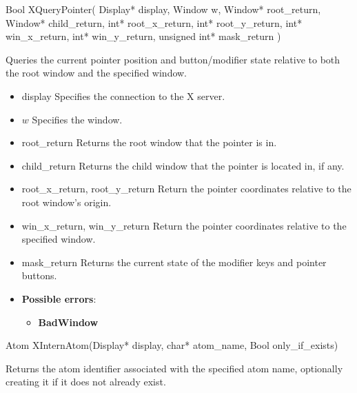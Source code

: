 \documentclass{report}
\begin{document}
\begin{itemize}
            \begin{cppcode}
                Bool XQueryPointer(
                    Display* display,
                    Window w,
                    Window* root_return, Window* child_return,
                    int* root_x_return, int* root_y_return,
                    int* win_x_return, int* win_y_return,
                    unsigned int* mask_return
                )
            \end{cppcode}
            \bigbreak \noindent
            Queries the current pointer position and button/modifier state relative to both the root window and the specified window.
            \begin{itemize}
                \item display Specifies the connection to the X server.
                \item $w$ Specifies the window.
                \item root\_return Returns the root window that the pointer is in.
                \item child\_return Returns the child window that the pointer is located in, if any.
                \item root\_x\_return, root\_y\_return Return the pointer coordinates relative to the root window’s origin.
                \item win\_x\_return, win\_y\_return Return the pointer coordinates relative to the specified window.
                \item mask\_return Returns the current state of the modifier keys and pointer buttons.
            \end{itemize}
            \begin{itemize}
                \item \textbf{Possible errors}:
                    \begin{itemize}
                        \item \textbf{BadWindow}
                    \end{itemize}
            \end{itemize}

            \begin{cppcode}
            Atom XInternAtom(Display* display, char* atom_name, Bool only_if_exists)
            \end{cppcode}
            \bigbreak \noindent
            Returns the atom identifier associated with the specified atom name, optionally creating it if it does not already exist.


\end{itemize}
\end{document}
